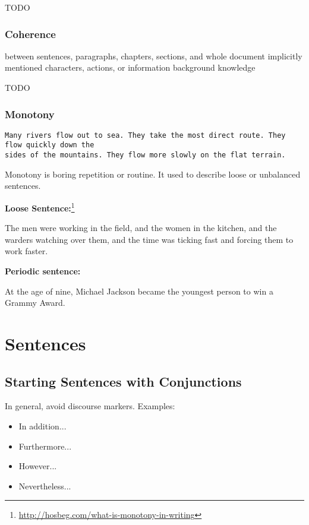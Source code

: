 \documentclass[10pt,a4paper]{book}
\begin{document}
\color{BrickRed}TODO\color{black}


\subsection{Coherence}

between sentences, paragraphs, chapters, sections, and whole document
implicitly mentioned characters, actions, or information
background knowledge

\color{BrickRed}TODO\color{black}


\subsection{Monotony}

\begin{verbatim}
Many rivers flow out to sea. They take the most direct route. They flow quickly down the
sides of the mountains. They flow more slowly on the flat terrain.
\end{verbatim}

Monotony is boring repetition or routine. It used to describe loose or unbalanced sentences.

\textbf{Loose Sentence:}\footnote{\url{http://hosbeg.com/what-is-monotony-in-writing}}

The men were working in the field, and the women in the kitchen, and the warders watching over them, and the time was ticking fast and forcing them to work faster.

\textbf{Periodic sentence:}

At the age of nine, Michael Jackson became the youngest person to win a Grammy Award.


\chapter{Sentences}

\section{Starting Sentences with Conjunctions}

In general, avoid discourse markers. Examples:
\begin{itemize}
    \itemsep1pt\parskip0pt
    \item In addition...
    \item Furthermore...
    \item However...
    \item Nevertheless...
\end{itemize}
\end{document}
